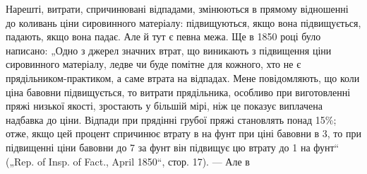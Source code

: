 Нарешті, витрати, спричинювані відпадами, змінюються в прямому
відношенні до коливань ціни сировинного матеріалу: підвищуються,
якщо вона підвищується, падають, якщо вона падає. Але
й тут є певна межа. Ще в 1850 році було написано: „Одно з джерел
значних втрат, що виникають з підвищення ціни сировинного
матеріалу, ледве чи буде помітне для кожного, хто не є
прядільником-практиком, а саме втрата на відпадах. Мене повідомляють,
що коли ціна бавовни підвищується, то витрати прядільника,
особливо при виготовленні пряжі низької якості, зростають
у більшій мірі, ніж це показує виплачена надбавка до
ціни. Відпади при прядінні грубої пряжі становлять понад 15\%;
отже, якщо цей процент спричинює втрату в  на фунт
при ціні бавовни в 3, то при підвищенні ціни бавовни
до 7 за фунт він підвищує цю втрату до 1 на
фунт“ („Rep. of Insp. of Fact., April 1850“, стор. 17). — Але в
\parbreak{}  %
